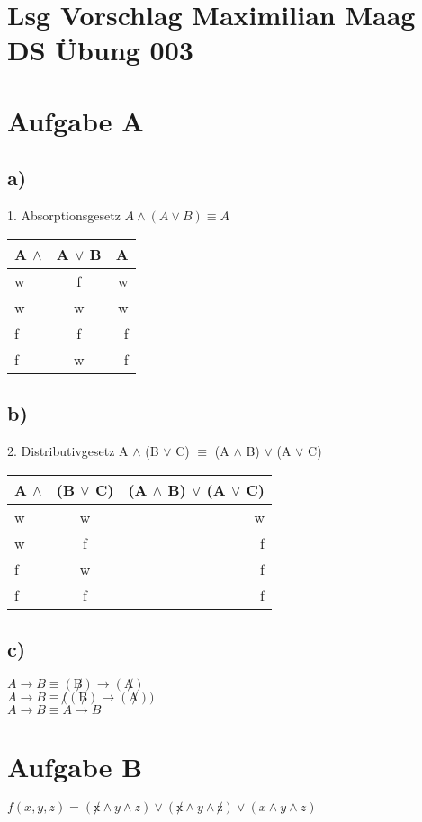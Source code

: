 \documentclass{article}
\begin{document}
	\section*{Lsg Vorschlag Maximilian Maag DS Übung 003}
	\section*{Aufgabe A}
	\subsection*{a)}
	1. Absorptionsgesetz $A \land (A \lor B) \equiv A$ \\
	\begin{tabular}[h]{l|c|r}
		A $\land$ & A $\lor$ B & A \\
		\hline
		w & f  & w \\
		w & w & w \\
		f & f & f \\
		f & w & f 
	\end{tabular}
	\subsection*{b)}
	2. Distributivgesetz A $\land$ (B $\lor$ C) $\equiv$ (A $\land$ B) $\lor$ (A $\lor$ C) \\
	\begin{tabular}[h]{l|c|r}
		A $\land$ & (B $\lor$ C) & (A $\land$ B) $\lor$ (A $\lor$ C)  \\
		\hline
		w & w & w \\
		w & f & f \\
		f & w & f \\
		f & f & f
		
	\end{tabular}
	\subsection*{c)} $A \to B \equiv (\not B) \to (\not A)$ \\
	$A \to B \equiv \not ((\not B) \to (\not A))$ \\
	$A \to B \equiv A \to B $ 
	
	
	
	\section*{Aufgabe B}
	
	$f(x, y, z) = (\not x \land y \land z) \lor (\not x \land y \land \not z)  \lor (x \land y \land z)$
	
\end{document}
